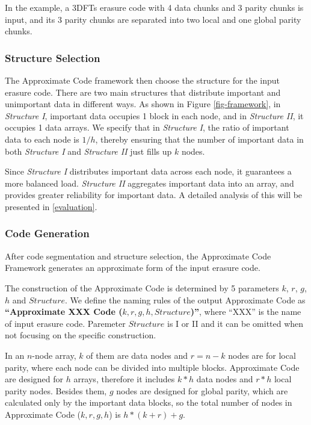 \documentclass[sigconf]{acmart}
\begin{document}
In the example, a 3DFTs erasure code with 4 data chunks and 3 parity chunks is input, and its 3 parity chunks are separated into two local and one global parity chunks.

\subsubsection{Structure Selection}
The Approximate Code framework then choose the structure for the input erasure code.
There are two main structures that distribute important and unimportant data in different ways.
As shown in Figure \ref{fig-framework}, in \emph{Structure I}, important data occupies 1 block in each node, and in \emph{Structure II}, it occupies 1 data arrays.
We specify that in \emph{Structure I}, the ratio of important data to each node is $1/h$, thereby ensuring that the number of important data in both \emph{Structure I} and \emph{Structure II} just fills up $k$ nodes.

Since \emph{Structure I} distributes important data across each node, it guarantees a more balanced load. \emph{Structure II} aggregates important data into an array, and provides greater reliability for important data. A detailed analysis of this will be presented in \ref{evaluation}.

\subsubsection{Code Generation}
After code segmentation and structure selection, the Approximate Code Framework generates an approximate form of the input erasure code.

The construction of the Approximate Code is determined by 5 parameters $k$, $r$, $g$, $h$ and $Structure$. 
We define the naming rules of the output Approximate Code as \textbf{``Approximate XXX Code ($k,r,g,h, Structure$)''}, where ``XXX'' is the name of input erasure code. Paremeter $Structure$ is I or II and it can be omitted when not focusing on the specific construction.

In an $n$-node array, $k$ of them are data nodes and $r=n-k$ nodes are for local parity, where each node can be divided into multiple blocks.
Approximate Code are designed for $h$ arrays, therefore it includes $k*h$ data nodes and $r*h$ local parity nodes.
Besides them, $g$ nodes are designed for global parity, which are calculated only by the important data blocks, so the total number of nodes in Approximate Code ($k,r,g,h$) is 
$h*(k+r) + g$.
\end{document}

